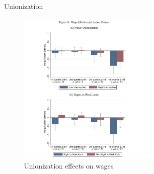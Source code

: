 \documentclass{beamer}
\begin{document}
\begin{frame}{Unionization}
  \begin{figure}
    \centering
    \includegraphics[width=0.6\textwidth]{counterfactual_union.png}
    \caption{Unionization effects on wages}
  \end{figure}
\end{frame}
\end{document}
